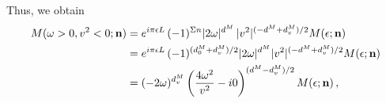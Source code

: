 \documentclass[12pt]{article}
\numberwithin{equation}{section}
\newcommand{\1}[1]{\mathbf{1}^{#1}}
\newcommand{\2}[1]{\mathbf{2}^{#1}}
\newcommand{\3}[1]{\mathbf{3}^{#1}}
\newcommand{\4}[1]{\mathbf{4}^{#1}}
\newcommand{\5}[1]{\mathbf{5}^{#1}}
\newcommand{\ep}{\epsilon}
\newcommand{\vv}{v^2}
\begin{document}
Thus, we obtain
\begin{align}
     M(\omega > 0 , \vv < 0; \mathbf{n})& = 
 e^{i\pi \epsilon L}\, (-1)^{\Sigma n} |2\omega|^{d^M} \, |\vv|^{(-d^M + d^M_v)/2}  M(\ep;\mathbf{n})
\notag\\&=
e^{i\pi \epsilon L}\,
(-1)^{(d^M_0 + d^M_v)/2}
|2\omega|^{d^M} 
|\vv|^{(-d^M + d^M_v)/2}  M(\ep;\mathbf{n})
{}
\notag\\&=
%
%
(- 2\omega)^{d^M_v}  \left(\frac{4\omega^2}{\vv} - i0\right)^{(d^M-d^M_v)/2} M(\ep;\mathbf{n})\,,
\end{align}
\end{document}
